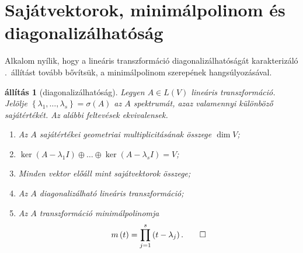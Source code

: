 \documentclass[9pt, a4paper, showtrims]{memoir}
\theoremstyle{plain}
\newtheorem{proposition}{állítás}[chapter]
\theoremstyle{remark}
\theoremstyle{definition}
\begin{document}
    \section{Sajátvektorok, minimálpolinom és diagonalizálhatóság}
    Alkalom nyílik, 
    hogy a lineáris transzformáció diagonalizálhatóságát karakterizáló .~állítást
    tovább bővítsük, a minimálpolinom szerepének hangsúlyozásával.
    \begin{proposition}[diagonalizálhatóság]
        Legyen $A\in L\left( V \right)$ lineáris transzformáció.
        Jelölje $\left\{ \lambda_1,\dots,\lambda_s \right\}=\sigma\left( A \right)$
        az $A$ spektrumát, 
        azaz valamennyi különböző sajátértékét.
        Az alábbi feltevések ekvivalensek.
        \begin{enumerate}
            \item Az $A$ sajátértékei geometriai multiplicitásának összege $\dim V$;
            \item 
                \begin{math}
                    \ker\left( A-\lambda_1 I \right)\oplus\dots\oplus\ker\left( A-\lambda_s I \right)=V
                \end{math};
            \item Minden vektor előáll mint sajátvektorok összege;
            \item Az $A$ diagonalizálható lineáris transzformáció;
            \item Az $A$ transzformáció minimálpolinomja
                \[
                    m\left( t \right)=
                    \prod_{j=1}^s\left( t-\lambda_j \right).
                    \qedhere
                \]
        \end{enumerate}
    \end{proposition}
\end{document}
